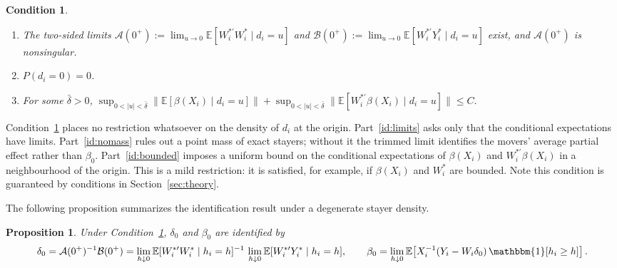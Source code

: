 \documentclass{article}
\newtheorem{proposition}{Proposition}
\newtheorem{condition}{Condition}
\newcommand{\normm}[1]{\lVert#1\rVert}
\newcommand{\E}{\mathbb{E}}
\newcommand{\I}{\mathbbm{1}}
\begin{document}
\begin{condition}\label{cond:identification}\leavevmode
    \begin{enumerate}
        \item\label{id:limits} The two-sided limits
        $\mathcal{A}(0^{+}):=\lim_{u\to 0}\E[W_i^{*\prime}W_i^{*}\mid d_i=u]$ and
        $\mathcal{B}(0^{+}):=\lim_{u\to 0}\E[W_i^{*\prime}Y_i^{*}\mid d_i=u]$
        exist, and $\mathcal{A}(0^{+})$ is nonsingular.
        \item\label{id:nomass} $P(d_i=0)=0$.
        \item\label{id:bounded} For some $\bar\delta>0$,
        $\displaystyle\sup_{0<|u|<\bar\delta}\normm{\E[\beta(X_i)\mid d_i=u]}
        +\sup_{0<|u|<\bar\delta}\normm{\E[W_i^{*\prime}\beta(X_i)\mid d_i=u]}\le C.$
    \end{enumerate}
\end{condition}

\noindent
Condition~\ref{cond:identification} places no restriction whatsoever on the density of $d_i$ at the origin. Part~\ref{id:limits} asks only that the conditional expectations have limits. Part~\ref{id:nomass} rules out a point mass of exact stayers; without it the trimmed limit identifies the movers' average partial effect rather than $\beta_0$. Part~\ref{id:bounded} imposes a uniform bound on the conditional expectations of $\beta(X_i)$ and $W_i^{*\prime}\beta(X_i)$ in a neighbourhood of the origin. This is a mild restriction: it is satisfied, for example, if $\beta(X_i)$ and $W_i^{*}$ are bounded. Note this condition is guaranteed by conditions in Section~\ref{sec:theory}.

The following proposition summarizes the identification result under a degenerate stayer density.

\begin{proposition}\label{prop:identification}
Under Condition~\ref{cond:identification}, $\delta_0$ and $\beta_0$ are identified by
\begin{align}\label{eq:id_degenerate}
    \delta_0 = \mathcal{A}(0^{+})^{-1}\mathcal{B}(0^{+})
    = \lim_{h \downarrow 0} \E[W_i^{*\prime}W_i^{*}\mid h_i=h]^{-1}\,
      \lim_{h \downarrow 0} \E[W_i^{*\prime}Y_i^{*}\mid h_i=h],
    \qquad
    \beta_0 = \lim_{h\downarrow0}\E\!\left[X_i^{-1}(Y_i-W_i\delta_0)\,\I[h_i\ge h]\right].
\end{align}
\end{proposition}
\end{document}
